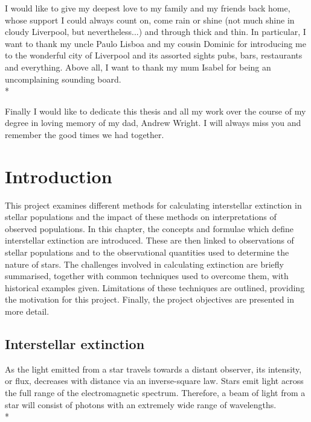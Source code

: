 \documentclass[12pt, a4paper]{report}
\begin{document}
I would like to give my deepest love to my family and my friends back home, whose support I could always count on, come rain or shine (not much shine in cloudy Liverpool, but nevertheless...) and through thick and thin. In particular, I want to thank my uncle Paulo Lisboa and my cousin Dominic for introducing me to the wonderful city of Liverpool and its assorted sights pubs, bars, restaurants and everything. Above all, I want to thank my mum Isabel for being an uncomplaining sounding board.\\*

Finally I would like to dedicate this thesis and all my work over the course of my degree in loving memory of my dad, Andrew Wright. I will always miss you and remember the good times we had together.


\chapter{Introduction}

This project examines different methods for calculating interstellar extinction in stellar populations and the impact of these methods on interpretations of observed populations. In this chapter, the concepts and formulae which define interstellar extinction are introduced. These are then linked to observations of stellar populations and to the observational quantities used to determine the nature of stars. The challenges involved in calculating extinction are briefly summarised, together with common techniques used to overcome them, with historical examples given. Limitations of these techniques are outlined, providing the motivation for this project. Finally, the project objectives are presented in more detail.

\section{Interstellar extinction} \label{ext_def}

As the light emitted from a star travels towards a distant observer, its intensity, or flux, decreases with distance via an inverse-square law. Stars emit light across the full range of the electromagnetic spectrum. Therefore, a beam of light from a star will consist of photons with an extremely wide range of wavelengths. \\*
\end{document}
